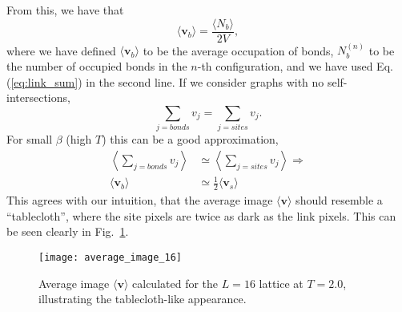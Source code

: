 \documentclass[../main.tex]{subfiles}
\begin{document}
From this, we have that
\begin{equation}
    \langle \mathbf{v}_b\rangle = \frac{\langle N_b\rangle}{2V},
\end{equation}
where we have defined $\langle \mathbf{v}_b\rangle$ to be the average occupation of bonds, $N_b^{(n)}$ to be the number
of occupied bonds in the $n$-th configuration, and we have used Eq.(\ref{eq:link_sum}) in the second line. If we
consider graphs with no self-intersections,
\begin{equation}
    \sum_{j=bonds} v_j = \sum_{j=sites} v_j.
    \label{bonds_equal_sites}
\end{equation}
For small $\beta$ (high $T$) this can be a good approximation,
\begin{align}
    \left\langle \sum_{j=bonds} v_j \right\rangle &\simeq \left\langle
    \sum_{j=sites} v_j\right\rangle\Longrightarrow\\
    \langle\mathbf{v}_b\rangle &\simeq \frac{1}{2}\langle\mathbf{v}_s\rangle
    \label{avg_bonds_equal_sites}
\end{align}
This agrees with our intuition, that the average image $\langle \mathbf{v}\rangle$ should resemble a ``tablecloth'',
where the site pixels are twice as dark as the link pixels. This can be seen clearly in Fig.~\ref{fig:average_image}.
\begin{figure}[htpb]
    \centering
    \texttt{[image: average\_image\_16]}
    \caption{Average image $\langle \mathbf{v}\rangle$ calculated for the
        $L = 16$ lattice at $T = 2.0$, illustrating the
        tablecloth-like appearance.}
    \label{fig:average_image}
\end{figure}
\end{document}

